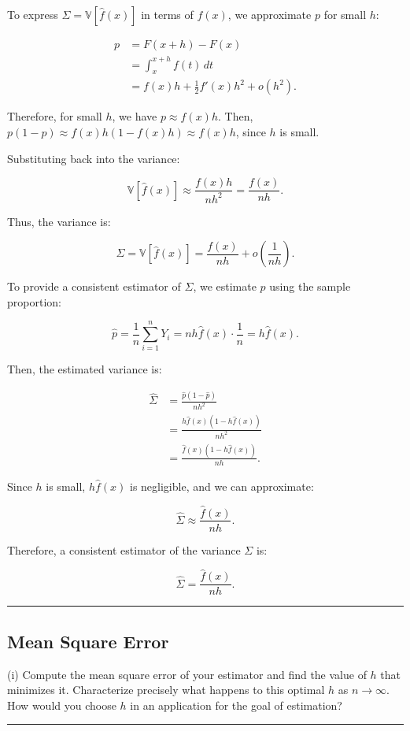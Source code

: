 \documentclass{article}
\newenvironment{colorparagraph}[1]{\par\color{#1}}{\par}
\begin{document}
To express \( \Sigma = \mathbb{V}[\hat{f}(x)] \) in terms of \( f(x) \), we approximate \( p \) for small \( h \):

\[
\begin{aligned}
p &= F(x + h) - F(x) \\
&= \int_x^{x + h} f(t) \, dt \\
&= f(x) h + \frac{1}{2} f'(x) h^2 + o(h^2).
\end{aligned}
\]

Therefore, for small \( h \), we have \( p \approx f(x) h \). Then, \( p (1 - p) \approx f(x) h (1 - f(x) h) \approx f(x) h \), since \( h \) is small.

Substituting back into the variance:

\[
\mathbb{V}[\hat{f}(x)] \approx \frac{f(x) h}{n h^2} = \frac{f(x)}{n h}.
\]

Thus, the variance is:

\[
\Sigma = \mathbb{V}[\hat{f}(x)] = \frac{f(x)}{n h} + o\left( \frac{1}{n h} \right).
\]

To provide a consistent estimator of \( \Sigma \), we estimate \( p \) using the sample proportion:

\[
\hat{p} = \frac{1}{n} \sum_{i=1}^n Y_i = n h \hat{f}(x) \cdot \frac{1}{n} = h \hat{f}(x).
\]

Then, the estimated variance is:

\[
\begin{aligned}
\hat{\Sigma} &= \frac{\hat{p} (1 - \hat{p})}{n h^2} \\
&= \frac{h \hat{f}(x) \left( 1 - h \hat{f}(x) \right)}{n h^2} \\
&= \frac{\hat{f}(x) \left( 1 - h \hat{f}(x) \right)}{n h}.
\end{aligned}
\]

Since \( h \) is small, \( h \hat{f}(x) \) is negligible, and we can approximate:

\[
\hat{\Sigma} \approx \frac{\hat{f}(x)}{n h}.
\]

Therefore, a consistent estimator of the variance \( \Sigma \) is:

\[
\hat{\Sigma} = \frac{\hat{f}(x)}{n h}.
\]

\begin{colorparagraph}{questioncolor}
\label{q2i}
\rule{\textwidth}{0.5pt}
\subsection{Mean Square Error}
(i) Compute the mean square error of your estimator and find the value of \( h \) that minimizes it. Characterize precisely what happens to this optimal \( h \) as \( n \to \infty \). How would you choose \( h \) in an application for the goal of estimation?

\rule{\textwidth}{0.5pt}
\end{colorparagraph}
\end{document}
